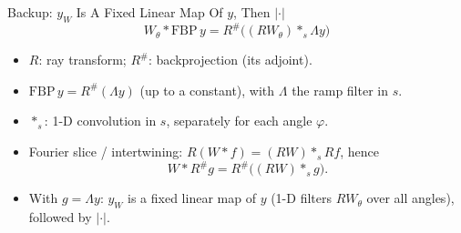 \documentclass[aspectratio=169]{beamer}
\begin{document}
\begin{frame}{Backup: $y_W$ Is A Fixed Linear Map Of $y$, Then $|\cdot|$}
  \[
    W_\theta*\mathrm{FBP}\,y=R^\#\bigl((RW_\theta)*_s\Lambda y\bigr)
  \]
  \begin{itemize}
    \item $R$: ray transform; $R^\#$: backprojection (its adjoint).
    \item $\mathrm{FBP}\,y=R^\#(\Lambda y)$ (up to a constant), with $\Lambda$ the ramp filter in $s$.
    \item $*_s$: 1-D convolution in $s$, separately for each angle $\varphi$.
    \item Fourier slice / intertwining: $R(W*f)=(RW)*_s Rf$, hence
      \[
        W*R^\#g=R^\#\bigl((RW)*_s g\bigr).
      \]
    \item With $g=\Lambda y$: $y_W$ is a fixed linear map of $y$ (1-D filters $RW_\theta$ over all angles), followed by $|\cdot|$.
  \end{itemize}
\end{frame}
\end{document}
